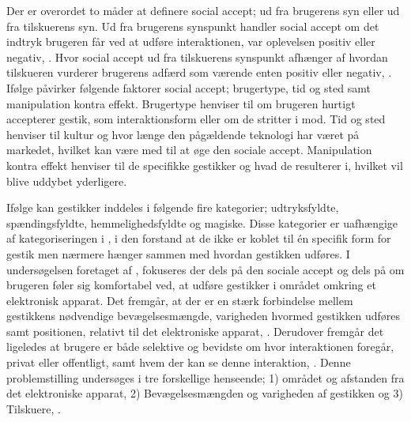 %
Der er overordet to måder at definere social accept; ud fra brugerens syn eller ud fra tilskuerens syn. Ud fra brugerens synspunkt handler social accept om det indtryk brugeren får ved at udføre interaktionen, var oplevelsen positiv eller negativ, \parencite[s. 276]{PDF:WouldYouDoThat}. Hvor social accept ud fra tilskuerens synspunkt afhænger af hvordan tilskueren vurderer brugerens adfærd som værende enten positiv eller negativ, \parencite[s. 276]{PDF:WouldYouDoThat}. Ifølge \textcite[s. 276]{PDF:WouldYouDoThat} påvirker følgende faktorer social accept; brugertype, tid og sted samt manipulation kontra effekt. Brugertype henviser til om brugeren hurtigt accepterer gestik, som interaktionsform eller om de stritter i mod. Tid og sted henviser til kultur og hvor længe den pågældende teknologi har været på markedet, hvilket kan være med til at øge den sociale accept. Manipulation kontra effekt henviser til de specifikke gestikker og hvad de resulterer i, hvilket vil blive uddybet yderligere.

Ifølge \textcite[s. 276]{PDF:WouldYouDoThat} kan gestikker inddeles i følgende fire kategorier; udtryksfyldte, spændingsfyldte, hemmelighedsfyldte og magiske. Disse kategorier er uafhængige af kategoriseringen i , i den forstand at de ikke er koblet til én specifik form for gestik men nærmere hænger sammen med hvordan gestikken udføres.\blankline
%
I undersøgelsen foretaget af \textcite[s. 193]{PDF:AreYouComfortableDoingThat}, fokuseres der dels på den sociale accept og dels på om brugeren føler sig komfortabel ved, at udføre gestikker i området omkring et elektronisk apparat. Det fremgår, at der er en stærk forbindelse mellem gestikkens nødvendige bevægelsesmængde, varigheden hvormed gestikken udføres samt positionen, relativt til det elektroniske apparat, \parencite[s. 193]{PDF:AreYouComfortableDoingThat}. Derudover fremgår det ligeledes at brugere er både selektive og bevidste om hvor interaktionen foregår, privat eller offentligt, samt hvem der kan se denne interaktion, \parencite[s. 193]{PDF:AreYouComfortableDoingThat}. Denne problemstilling undersøges i tre forskellige henseende; 1) området og afstanden fra det elektroniske apparat, 2) Bevægelsesmængden og varigheden af gestikken og 3) Tilskuere, \parencite[ss. 195-200]{PDF:AreYouComfortableDoingThat}. 

